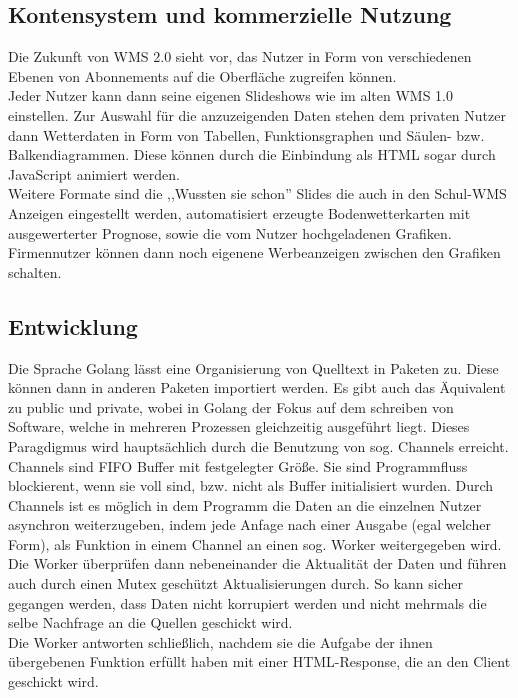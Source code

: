 \subsection{Kontensystem und kommerzielle Nutzung}
Die Zukunft von WMS 2.0 sieht vor, das Nutzer in Form von verschiedenen Ebenen von
Abonnements auf die Oberfläche zugreifen können.\\
Jeder Nutzer kann dann seine eigenen Slideshows wie im alten WMS 1.0 einstellen.
Zur Auswahl für die anzuzeigenden Daten stehen dem privaten Nutzer dann Wetterdaten
in Form von Tabellen, Funktionsgraphen und Säulen- bzw. Balkendiagrammen. Diese
können durch die Einbindung als HTML sogar durch JavaScript animiert werden. \\
Weitere Formate sind die ,,Wussten sie schon'' Slides die auch in den Schul-WMS Anzeigen
eingestellt werden, automatisiert erzeugte Bodenwetterkarten mit ausgewerterter Prognose,
sowie die vom Nutzer hochgeladenen Grafiken.
Firmennutzer können dann noch eigenene Werbeanzeigen zwischen den Grafiken schalten.

\subsection{Entwicklung} %
Die Sprache Golang lässt eine Organisierung von Quelltext in Paketen zu. Diese können dann in
anderen Paketen importiert werden. Es gibt auch das Äquivalent zu public und private, wobei in
Golang der Fokus auf dem schreiben von Software, welche in mehreren Prozessen gleichzeitig ausgeführt liegt.
Dieses Paragdigmus wird hauptsächlich durch die Benutzung von sog. Channels erreicht. Channels sind FIFO
Buffer mit festgelegter Größe. Sie sind Programmfluss blockierent, wenn sie voll sind, bzw. nicht als Buffer
initialisiert wurden. Durch Channels ist es möglich in dem Programm die Daten an die einzelnen Nutzer asynchron
weiterzugeben, indem jede Anfage nach einer Ausgabe (egal welcher Form), als Funktion in einem Channel an
einen sog. Worker weitergegeben wird.\\
Die Worker überprüfen dann nebeneinander die Aktualität der Daten und führen auch durch einen Mutex geschützt
Aktualisierungen durch. So kann sicher gegangen werden, dass Daten nicht korrupiert werden und nicht mehrmals die
selbe Nachfrage an die Quellen geschickt wird.\\
Die Worker antworten schließlich, nachdem sie die Aufgabe der ihnen übergebenen Funktion erfüllt haben mit einer
HTML-Response, die an den Client geschickt wird.
